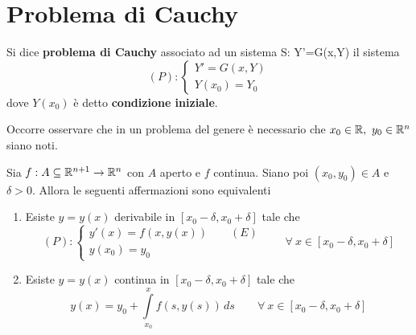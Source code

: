 \section{Problema di Cauchy}
\begin{definition}
    Si dice \textbf{problema di Cauchy} associato ad un sistema S: Y'=G(x,Y) il sistema
    \begin{equation}
       (P): \begin{cases}
            Y'=G(x, Y)\\
            Y(x_0)=Y_0
        \end{cases}
    \end{equation}
    dove $Y(x_0)$ è detto \textbf{condizione iniziale}.
\end{definition}
Occorre osservare che in un problema del genere è necessario che $x_0 \in \mathbb{R},\ y_0 \in \mathbb{R}^n$ siano noti.
\begin{lemma} \label{Lemma: Formulazione integrale del problema di Cauchy}
    Sia $f: A \subseteq \mathbb{R}^{n+1} \to \mathbb{R}^n$ con $A$ aperto e $f$ continua. Siano poi $(x_0, y_0) \in A$ e $\delta>0$. Allora le seguenti affermazioni sono equivalenti
    \begin{enumerate}
        \item Esiste $y=y(x)$ derivabile in $[x_0-\delta, x_0+\delta]$ tale che 
        \begin{equation}
            (P): \begin{cases}
                y'(x)=f(x, y(x)) \qquad (E)\\
                y(x_0)=y_0 
            \end{cases}
            \qquad \forall\ x \in [x_0-\delta, x_0+\delta]
        \end{equation}
        \item Esiste $y=y(x)$ continua in $[x_0-\delta, x_0+\delta]$ tale che 
        \begin{equation} \label{Eq: Equazione integrale di Volterra}
            y(x)= y_0 + \int\limits_{x_0}^{x}{f(s, y(s))}\, ds \qquad \forall\ x \in [x_0-\delta, x_0+\delta]
        \end{equation}
    \end{enumerate}
\end{lemma}
